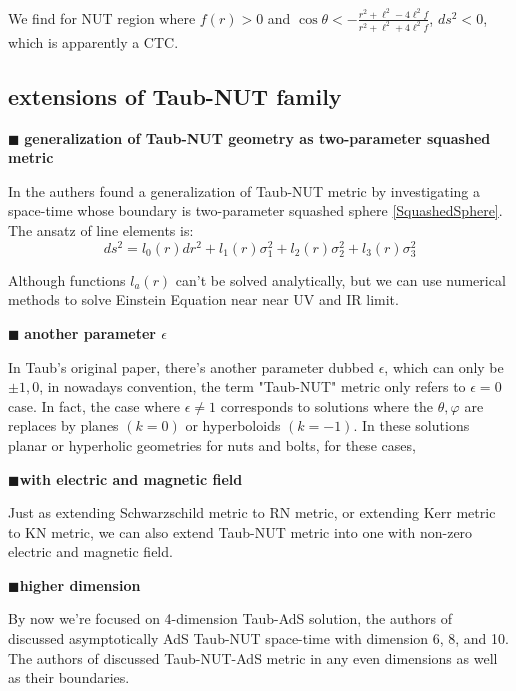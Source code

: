 \documentclass[12pt, a4paper]{article}
\numberwithin{equation}{section}
\newcommand{\be}{\begin{equation}}
\newcommand{\ee}{\end{equation}}
\begin{document}
We find for NUT region where $f(r) > 0$ and $\cos\theta < -\frac{r^2 + \ell^2 -4\ell^2 f}{r^2 + \ell^2 +4 \ell^2 f}$, $ds^2 < 0$, which is apparently a CTC. 

\subsection{extensions of Taub-NUT family}
$\blacksquare$\textbf{ generalization of Taub-NUT geometry as two-parameter squashed metric}

In \cite{Bobev:2016sh} the authers found a generalization of Taub-NUT metric by investigating a space-time whose boundary is two-parameter squashed sphere \ref{SquashedSphere}. The ansatz of line elements is:
\be
ds^2 = l_0(r)dr^2 + l_1(r)\sigma_1^2 + l_2(r)\sigma_2^2 + l_3(r)\sigma_3^2
\ee

Although functions $l_a(r)$ can't be solved analytically, but we can use numerical methods to solve Einstein Equation near near UV and IR limit.

$\blacksquare$ \textbf{another parameter $\epsilon$}

In Taub's original paper\cite{Taub:1951gm}, there's another parameter dubbed $\epsilon$, which can only be $\pm 1, 0$, in nowadays convention, the term "Taub-NUT" metric only refers to $\epsilon = 0$ case. \cite{Griffiths:2009gr} In fact, the case where $\epsilon \ne 1$ corresponds to solutions where the $\theta, \varphi$ are replaces by planes $(k = 0)$ or hyperboloids $(k = -1)$. In these solutions planar or hyperholic geometries for nuts and bolts,\cite{Chamblin:1998ah}\cite{Emparan:1999ac}\cite{Griffiths:2009gr} for these cases, {\color{red}{the bundle is trivial and we don't have to worry about Misner strings even though the $(\theta,\varphi)$ section is compact, but the boundary is still not flat.}}

$\blacksquare$\textbf{with electric and magnetic field}

Just as extending Schwarzschild metric to RN metric, or extending Kerr metric to KN metric, we can also extend Taub-NUT metric into one with non-zero electric and magnetic field.\cite{Griffiths:2009gr}

$\blacksquare$\textbf{higher dimension}

By now we're focused on 4-dimension Taub-AdS solution, the authors of \cite{Awad:2002ts} discussed asymptotically AdS Taub-NUT space-time with dimension 6, 8, and 10. The authors of \cite{Astefanesei:2004cb} discussed Taub-NUT-AdS metric in any even dimensions as well as their boundaries.
\end{document}
